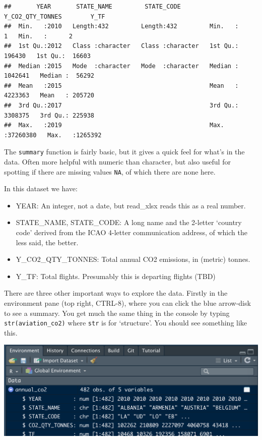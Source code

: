 \documentclass[
]{book}
\providecommand{\tightlist}{%
  \setlength{\itemsep}{0pt}\setlength{\parskip}{0pt}}
\begin{document}
\begin{verbatim}
##       YEAR       STATE_NAME         STATE_CODE        Y_CO2_QTY_TONNES        Y_TF        
##  Min.   :2010   Length:432         Length:432         Min.   :       1   Min.   :      2  
##  1st Qu.:2012   Class :character   Class :character   1st Qu.:  196430   1st Qu.:  16603  
##  Median :2015   Mode  :character   Mode  :character   Median : 1042641   Median :  56292  
##  Mean   :2015                                         Mean   : 4223363   Mean   : 205720  
##  3rd Qu.:2017                                         3rd Qu.: 3308375   3rd Qu.: 225938  
##  Max.   :2019                                         Max.   :37260380   Max.   :1265392
\end{verbatim}

The \texttt{summary} function is fairly basic, but it gives a quick feel for what's in the data. Often more helpful with numeric than character, but also useful for spotting if there are missing values \texttt{NA}, of which there are none here.

In this dataset we have:

\begin{itemize}
\tightlist
\item
  YEAR: An integer, not a date, but read\_xlsx reads this as a real number.
\item
  STATE\_NAME, STATE\_CODE: A long name and the 2-letter `country code' derived from the ICAO 4-letter communication address, of which the less said, the better.
\item
  Y\_CO2\_QTY\_TONNES: Total annual CO2 emissions, in (metric) tonnes.
\item
  Y\_TF: Total flights. Presumably this is departing flights (TBD)
\end{itemize}

There are three other important ways to explore the data. Firstly in the environment pane (top right, CTRL-8), where you can click the blue arrow-disk to see a summary. You get much the same thing in the console by typing \texttt{str(aviation\_co2)} where \texttt{str} is for `structure'. You should see something like this.

\includegraphics{images/CO2inEnvironment.png}
\end{document}

